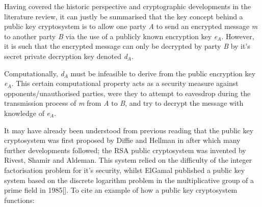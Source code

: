 \documentclass[iwp,first]{luthesis}
\begin{document}
Having covered the historic perspective and cryptographic developments in the literature review, it can justly be summarised that the key concept behind a public key cryptosystem is to allow one party \textit{A} to send an encrypted message \textit{m} to another party \textit{B} via the use of a publicly known encryption key \textit{e$_A$}. However, it is such that the encrypted message can only be decrypted by party \textit{B} by it's secret private decryption key denoted \textit{d$_A$}.

Computationally, \textit{d$_A$} must be infeasible to derive from the public encryption key \textit{e$_A$}. This certain computational property acts as a security measure against opponents/unauthorised parties, were they to attempt to eavesdrop during the transmission process of \textit{m} from \textit{A} to \textit{B}, and try to decrypt the message with knowledge of \textit{e$_A$}. 

It may have already been understood from previous reading that the public key cryptosystem was first proposed by Diffie and Hellman in \cite{NDCrypt} after which many further developments followed; the RSA public cryptosystem was invented by Rivest, Shamir and Aldeman. This system relied on the difficulty of the integer factorisation problem for it's security, whilst ElGamal published a public key system based on the discrete logarithm problem in the multiplicative group of a prime field in 1985[].  To cite an example of how a public key cryptosystem functions:
\end{document}

